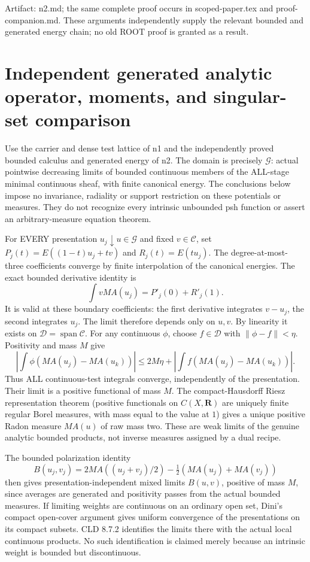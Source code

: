 \documentclass[11pt]{article}
\begin{document}
Artifact: n2.md; the same complete proof occurs in scoped-paper.tex and proof-companion.md. These arguments independently supply the relevant bounded and generated energy chain; no old ROOT proof is granted as a result.


\section*{Independent generated analytic operator, moments, and singular-set comparison}

Use the carrier and dense test lattice of n1 and the independently proved bounded calculus and generated energy of n2. The domain is precisely $\mathcal G$: actual pointwise decreasing limits of bounded continuous members of the ALL-stage minimal continuous sheaf, with finite canonical energy. The conclusions below impose no invariance, radiality or support restriction on these potentials or measures. They do not recognize every intrinsic unbounded psh function or assert an arbitrary-measure equation theorem.

For EVERY presentation $u_j\downarrow u\in\mathcal G$ and fixed $v\in\mathcal C$, set $P_j(t)=E((1-t)u_j+tv)$ and $R_j(t)=E(tu_j)$. The degree-at-most-three coefficients converge by finite interpolation of the canonical energies. The exact bounded derivative identity is
\[
 \int vMA(u_j)=P'_j(0)+R'_j(1).
\]
It is valid at these boundary coefficients: the first derivative integrates $v-u_j$, the second integrates $u_j$. The limit therefore depends only on $u,v$. By linearity it exists on $\mathcal D=\operatorname{span}\mathcal C$. For any continuous $\phi$, choose $f\in\mathcal D$ with $\|\phi-f\|<\eta$. Positivity and mass $M$ give
\[
 \left|\int\phi(MA(u_j)-MA(u_k))\right|
 \le2M\eta+\left|\int f(MA(u_j)-MA(u_k))\right|.
\]
Thus ALL continuous-test integrals converge, independently of the presentation. Their limit is a positive functional of mass $M$. The compact-Hausdorff Riesz representation theorem (positive functionals on $C(X,\mathbf R)$ are uniquely finite regular Borel measures, with mass equal to the value at $1$) gives a unique positive Radon measure $MA(u)$ of raw mass two. These are weak limits of the genuine analytic bounded products, not inverse measures assigned by a dual recipe.

The bounded polarization identity
\[
 B(u_j,v_j)=2MA((u_j+v_j)/2)-\tfrac12(MA(u_j)+MA(v_j))
\]
then gives presentation-independent mixed limits $B(u,v)$, positive of mass $M$, since averages are generated and positivity passes from the actual bounded measures. If limiting weights are continuous on an ordinary open set, Dini's compact open-cover argument gives uniform convergence of the presentations on its compact subsets. CLD 8.7.2 identifies the limits there with the actual local continuous products. No such identification is claimed merely because an intrinsic weight is bounded but discontinuous.
\end{document}
